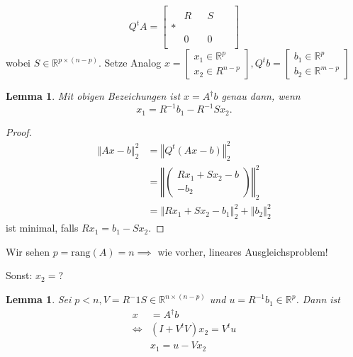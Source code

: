 \documentclass{book}
\newtheorem{lemma}[algorithm]{Lemma}
\def\R{\mathbb{R}}
\def\rang{\text{rang}}
\begin{document}
            \begin{equation}\label{g2.6}
                Q^tA=\begin{bmatrix}
                    &  &  & & & \\
                    & R & & S & & \\
                    * & & & & &\\
                    & 0 & &  0 & & \\ 
                \end{bmatrix}
            \end{equation}
            wobei  $S\in \R^{p\times (n-p)}$.
            Setze Analog $x=\begin{bmatrix}
                x_1\in\R^p\\
                x_2\in R^{n-p}
            \end{bmatrix},Q^t b=\begin{bmatrix}
                b_1\in\R^p\\
                b_2\in \R^{m-p}
            \end{bmatrix}$

            \begin{lemma}\label{l2.24}
                Mit obigen Bezeichungen ist $x=A^\dagger b$ genau dann, wenn \[x_1=R^{-1}b_1-R^{-1}Sx_2.\]
            \end{lemma}
            \begin{proof}
                \begin{align*}
                    \left\Vert Ax-b \right\Vert_2^2&=\left\Vert Q^t(Ax-b) \right\Vert_2^2\\
                    &=\left\Vert \begin{pmatrix}
                        Rx_1+Sx_2-b\\
                        -b_2
                    \end{pmatrix} \right\Vert_2^2\\
                    &= \left\Vert Rx_1+Sx_2 -b_1\right\Vert_2^2+\left\Vert b_2 \right\Vert_2^2
                \end{align*}
                ist minimal, falls $Rx_1=b_1-Sx_2$.
            \end{proof}

            Wir sehen $p=\rang(A)=n\implies$ wie vorher, lineares Ausgleichsproblem!

            Sonst: $x_2=$?

            \begin{lemma}\label{l2.25}
                Sei $p<n,V=R^-1S\in\R^{n\times (n-p)}$ und $u=R^{-1}b_1\in\R^p$. Dann ist
                \begin{align*}
                    x&=A^\dagger b\\
                    \iff &(I+V^tV)x_2=V^tu\\
                    &x_1=u-Vx_2
                \end{align*}
            \end{lemma}
\end{document}
